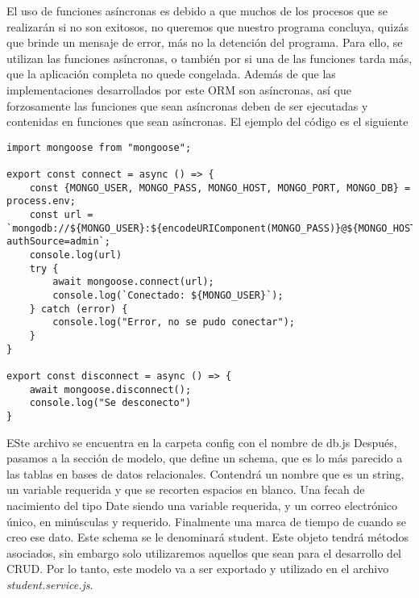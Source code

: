 \documentclass[12pt,a4paper]{report}
\begin{document}
El uso de funciones asíncronas es debido a que muchos de los procesos que se realizarán si no son exitosos, no queremos que nuestro programa concluya, quizás que brinde un mensaje de error, más no la detención del programa. Para ello, se utilizan las funciones asíncronas, o también por si una de las funciones tarda más, que la aplicación completa no quede congelada. Además de que las implementaciones desarrollados por este ORM son asíncronas, así que forzosamente las funciones que sean asíncronas deben de ser ejecutadas y contenidas en funciones que sean asíncronas.
El ejemplo del código es el siguiente
\begin{lstlisting}[style=javascript, caption={Conexión a MongoDB con Mongoose}]
import mongoose from "mongoose";

export const connect = async () => {
    const {MONGO_USER, MONGO_PASS, MONGO_HOST, MONGO_PORT, MONGO_DB} = process.env;
    const url = `mongodb://${MONGO_USER}:${encodeURIComponent(MONGO_PASS)}@${MONGO_HOST}:${MONGO_PORT}/${MONGO_DB}?authSource=admin`;
    console.log(url)
    try {
        await mongoose.connect(url);
        console.log(`Conectado: ${MONGO_USER}`);
    } catch (error) {
        console.log("Error, no se pudo conectar");
    }
}

export const disconnect = async () => {
    await mongoose.disconnect();
    console.log("Se desconecto")
}
\end{lstlisting}
ESte archivo se encuentra en la carpeta config con el nombre de db.js
Después, pasamos a la sección de modelo, que define un schema, que es lo más parecido a las tablas en bases de datos relacionales. Contendrá un nombre que es un string, un variable requerida y que se recorten espacios en blanco. Una fecah de nacimiento del tipo Date siendo una variable requerida, y un correo electrónico único, en minúsculas y requerido. Finalmente una marca de tiempo de cuando se creo ese dato. Este schema se le denominará student.
Este objeto tendrá métodos asociados, sin embargo solo utilizaremos aquellos que sean para el desarrollo del CRUD. 
Por lo tanto, este modelo va a ser exportado y utilizado en el archivo \textit{student.service.js}.
\end{document}
